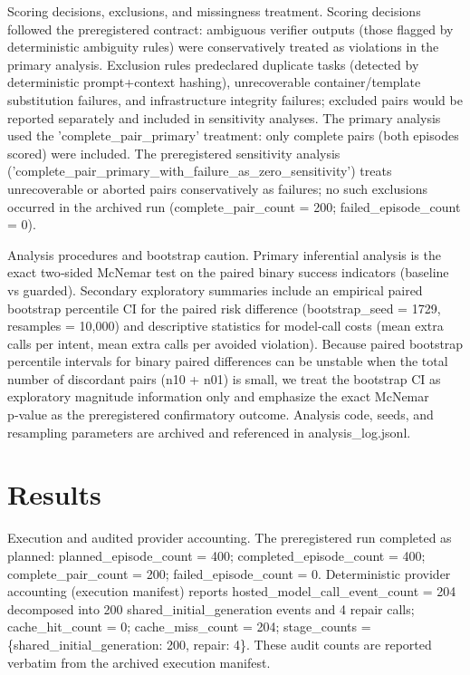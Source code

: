 \documentclass[conference]{IEEEtran}
\begin{document}
Scoring decisions, exclusions, and missingness treatment. Scoring decisions followed the preregistered contract: ambiguous verifier outputs (those flagged by deterministic ambiguity rules) were conservatively treated as violations in the primary analysis. Exclusion rules predeclared duplicate tasks (detected by deterministic prompt+context hashing), unrecoverable container/template substitution failures, and infrastructure integrity failures; excluded pairs would be reported separately and included in sensitivity analyses. The primary analysis used the 'complete\_pair\_primary' treatment: only complete pairs (both episodes scored) were included. The preregistered sensitivity analysis ('complete\_pair\_primary\_with\_failure\_as\_zero\_sensitivity') treats unrecoverable or aborted pairs conservatively as failures; no such exclusions occurred in the archived run (complete\_pair\_count = 200; failed\_episode\_count = 0).

Analysis procedures and bootstrap caution. Primary inferential analysis is the exact two‑sided McNemar test on the paired binary success indicators (baseline vs guarded). Secondary exploratory summaries include an empirical paired bootstrap percentile CI for the paired risk difference (bootstrap\_seed = 1729, resamples = 10,000) and descriptive statistics for model‑call costs (mean extra calls per intent, mean extra calls per avoided violation). Because paired bootstrap percentile intervals for binary paired differences can be unstable when the total number of discordant pairs (n10 + n01) is small, we treat the bootstrap CI as exploratory magnitude information only and emphasize the exact McNemar p‑value as the preregistered confirmatory outcome. Analysis code, seeds, and resampling parameters are archived and referenced in analysis\_log.jsonl.

\section{Results}
Execution and audited provider accounting. The preregistered run completed as planned: planned\_episode\_count = 400; completed\_episode\_count = 400; complete\_pair\_count = 200; failed\_episode\_count = 0. Deterministic provider accounting (execution manifest) reports hosted\_model\_call\_event\_count = 204 decomposed into 200 shared\_initial\_generation events and 4 repair calls; cache\_hit\_count = 0; cache\_miss\_count = 204; stage\_counts = \{shared\_initial\_generation: 200, repair: 4\}. These audit counts are reported verbatim from the archived execution manifest.
\end{document}
